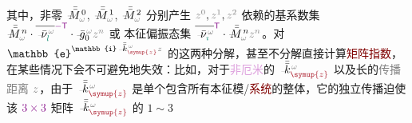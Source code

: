 其中，非零 $\xint{\mathcolor{gray}{-}}{18}{\bar{\bar{M}}}_{\mathcolor{gray}{\omega}}^{\;\! 0}$, $\xint{\mathcolor{gray}{-}}{18}{\bar{\bar{M}}}_{\mathcolor{gray}{\omega}}^{\;\! 1}$, $\xint{\mathcolor{gray}{-}}{18}{\bar{\bar{M}}}_{\mathcolor{gray}{\omega}}^{\;\! 2}$ 分别产生 $\mathcolor{gray}{z^0}, \mathcolor{gray}{z^1}, \mathcolor{gray}{z^2}$ 依赖的\textcolor{PineGreen}{基系数集} $\xint{\mathcolor{gray}{-}}{18}{\bar{\bar{M}}}_{\mathcolor{gray}{\omega}}^{\;\! n} \cdot \overline{\xint{\begin{smallmatrix} ~ \\ {}^{}_{\mathcolor{gray}{-}} \\ ~ \end{smallmatrix}}{15}{\bar{\nu}}^{\;\!\mathcolor{gray}{\omega}}_{\textcolor{PineGreen}{l}}}^{\textcolor{Plum}{-\mathsf{T}}} \cdot \xint{{}^{}_{\mathcolor{gray}{-}}}{10}{\bar{g}}^{\;\!\mathcolor{gray}{\omega}}_0 \mathcolor{gray}{z^n}$ 或 \textcolor{PineGreen}{本征偏振态集} $\overline{\xint{\begin{smallmatrix} ~ \\ {}^{}_{\mathcolor{gray}{-}} \\ ~ \end{smallmatrix}}{15}{\bar{\nu}}^{\;\!\mathcolor{gray}{\omega}}_{\textcolor{PineGreen}{\imath}}}^{\mathsf{\textcolor{Plum}{T}}} \cdot \xint{\mathcolor{gray}{-}}{18}{\bar{\bar{M}}}_{\mathcolor{gray}{\omega}}^{\;\! n} \mathcolor{gray}{z^n}$。对 $\mathbb{e}^{\mathbb{i} \xint{\begin{smallmatrix} ~ \\ {}^{}_{\mathcolor{gray}{-}} \\ ~ \end{smallmatrix}}{15}{\bar{\bar{k}}}_{\textcolor{Maroon}{\symup{z}}}^{\;\! \mathcolor{gray}{\omega}} \mathcolor{gray}{z}}$ 的这两种分解，甚至不分解直接计算\textcolor{Maroon}{矩阵指数}\cite{zarifiPlaneWaveReflection2014}，在某些情况下会不可避免地失效：比如，对于\textcolor{Plum}{非厄米}的 $\xint{\begin{smallmatrix} ~ \\ {}^{}_{\mathcolor{gray}{-}} \\ ~ \end{smallmatrix}}{15}{\bar{\bar{k}}}_{\textcolor{Maroon}{\symup{z}}}^{\;\! \mathcolor{gray}{\omega}}$ 以及长的\textcolor{gray}{传播距离} $\mathcolor{gray}{z}$，由于 $\xint{\begin{smallmatrix} ~ \\ {}^{}_{\mathcolor{gray}{-}} \\ ~ \end{smallmatrix}}{15}{\bar{\bar{k}}}_{\textcolor{Maroon}{\symup{z}}}^{\;\! \mathcolor{gray}{\omega}}$ 是单个包含所有\textcolor{PineGreen}{本征模}/\textcolor{Maroon}{系统}的整体，它的独立传播迫使该 $\textcolor{Plum}{3 \times 3}$ 矩阵 $\xint{\begin{smallmatrix} ~ \\ {}^{}_{\mathcolor{gray}{-}} \\ ~ \end{smallmatrix}}{15}{\bar{\bar{k}}}_{\textcolor{Maroon}{\symup{z}}}^{\;\! \mathcolor{gray}{\omega}}$ 的 $1\sim3$ 